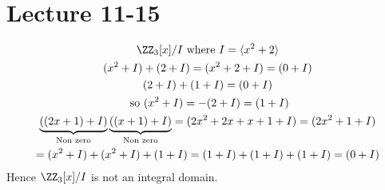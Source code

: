 \documentclass[class=scrartcl, crop=false]{standalone}
\date{2019-11-15}
\begin{document}
\section{Lecture 11-15}

\begin{example}
  \begin{gather*}
    \ZZ_3[x] / I \ \text{where} \ I = \langle x^2 + 2 \rangle \\
    (x^2 + I) + (2 + I) = (x^2 + 2 + I) = (0 + I) \\
    (2 + I) + (1 + I) = (0 + I) \\
    \ \text{so} \ (x^2 + I) = -(2 + I) = (1 + I) \\
    \underbrace{((2x + 1) + I)}_{\text{Non zero}}\underbrace{((x + 1) + I)}_{\text{Non zero}} = (2x^2 + 2x + x + 1 + I) = (2x^2 + 1 + I) \\
    = (x^2 + I) + (x^2 + I) + (1 + I) = (1 + I) + (1 + I) + (1 + I) = (0 + I)
  \end{gather*} 
  Hence $\ZZ_3[x] / I$ is not an integral domain.
\end{example} 
\end{document}
